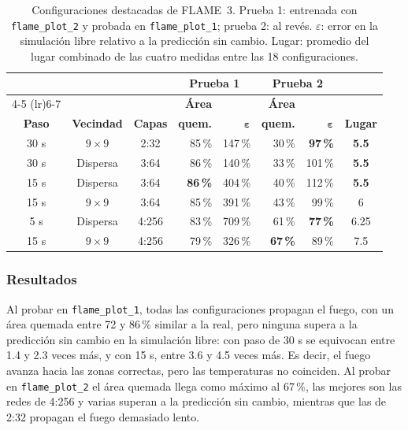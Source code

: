 \begin{table}[!t]
	\centering
	\footnotesize
	\setlength{\tabcolsep}{2.5pt}
	\begin{tabular}{@{}cccrrrrc@{}}
		\toprule
		& & & \multicolumn{2}{c}{\textbf{Prueba 1}} & \multicolumn{2}{c}{\textbf{Prueba 2}} & \\
		\cmidrule(lr){4-5} \cmidrule(lr){6-7}
		& & & \textbf{Área} & & \textbf{Área} & & \\
		\textbf{Paso} & \textbf{Vecindad} & \textbf{Capas} & \textbf{quem.} & $\boldsymbol{\varepsilon}$ & \textbf{quem.} & $\boldsymbol{\varepsilon}$ & \textbf{Lugar} \\
		\midrule
		30 s & $9\times9$ & 2:32 & 85\,\% & 147\,\% & 30\,\% & \textbf{97\,\%} & \textbf{5.5} \\
		30 s & Dispersa & 3:64 & 86\,\% & 140\,\% & 33\,\% & 101\,\% & \textbf{5.5} \\
		15 s & Dispersa & 3:64 & \textbf{86\,\%} & 404\,\% & 40\,\% & 112\,\% & \textbf{5.5} \\
		15 s & $9\times9$ & 3:64 & 85\,\% & 391\,\% & 43\,\% & 99\,\% & 6 \\
		5 s & Dispersa & 4:256 & 83\,\% & 709\,\% & 61\,\% & \textbf{77\,\%} & 6.25 \\
		15 s & $9\times9$ & 4:256 & 79\,\% & 326\,\% & \textbf{67\,\%} & 89\,\% & 7.5 \\
		\bottomrule
	\end{tabular}
	\caption{Configuraciones destacadas de FLAME~3. Prueba 1: entrenada con \texttt{flame\_plot\_2} y probada en \texttt{flame\_plot\_1}; prueba 2: al revés. $\varepsilon$: error en la simulación libre relativo a la predicción sin cambio. Lugar: promedio del lugar combinado de las cuatro medidas entre las 18 configuraciones.}
	\label{tab:flame}
\end{table}

\subsubsection{Resultados}
Al probar en \texttt{flame\_plot\_1}, todas las configuraciones propagan el fuego, con un área quemada entre 72 y 86\,\% similar a la real, pero ninguna supera a la predicción sin cambio en la simulación libre: con paso de 30 s se equivocan entre 1.4 y 2.3 veces más, y con 15 s, entre 3.6 y 4.5 veces más. Es decir, el fuego avanza hacia las zonas correctas, pero las temperaturas no coinciden. Al probar en \texttt{flame\_plot\_2} el área quemada llega como máximo al 67\,\%, las mejores son las redes de 4:256 y varias superan a la predicción sin cambio, mientras que las de 2:32 propagan el fuego demasiado lento.

